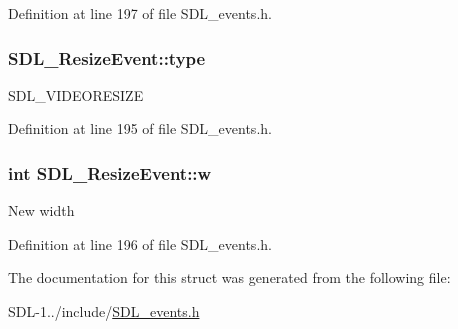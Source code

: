 Definition at line 197 of file S\+D\+L\+\_\+events.\+h.

\hypertarget{struct_s_d_l___resize_event_a0f35cba640e999f4dd77e4267b812525}{}
\subsubsection[{type}]{ S\+D\+L\+\_\+\+Resize\+Event\+::type}\label{struct_s_d_l___resize_event_a0f35cba640e999f4dd77e4267b812525}
S\+D\+L\+\_\+\+V\+I\+D\+E\+O\+R\+E\+S\+I\+Z\+E 

Definition at line 195 of file S\+D\+L\+\_\+events.\+h.

\hypertarget{struct_s_d_l___resize_event_acd9eca9322c2d247bb0329e2ea97fc0f}{}
\subsubsection[{w}]{\setlength{\rightskip}{0pt plus 5cm}int S\+D\+L\+\_\+\+Resize\+Event\+::w}\label{struct_s_d_l___resize_event_acd9eca9322c2d247bb0329e2ea97fc0f}
New width 

Definition at line 196 of file S\+D\+L\+\_\+events.\+h.



The documentation for this struct was generated from the following file\+:\begin{DoxyCompactItemize}
\item 
S\+D\+L-\/1../include/\hyperlink{_s_d_l__events_8h}{S\+D\+L\+\_\+events.\+h}\end{DoxyCompactItemize}
